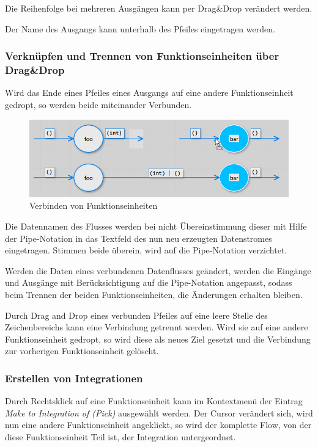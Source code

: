 	Die Reihenfolge bei mehreren Ausgängen kann per Drag\&Drop verändert werden.
	
	Der Name des Ausgangs kann unterhalb des Pfeiles eingetragen werden.
	
\subsubsection{Verknüpfen und Trennen von Funktionseinheiten über Drag\&Drop }

	Wird das Ende eines Pfeiles eines Ausgangs auf eine andere Funktionseinheit gedropt, so werden beide
	miteinander Verbunden. 
	
	\begin{figure}[H]
		\centering
		\includegraphics[width=1\linewidth]{./img/dragdrop.jpg} 
		\caption{Verbinden von Funktionseinheiten}
	\end{figure}
	
	
	
	
	Die Datennamen des Flusses werden bei nicht
	Übereinstimmung dieser mit Hilfe der Pipe-Notation in das Textfeld des nun neu
	erzeugten Datenstromes eingetragen. Stimmen beide überein, wird auf die Pipe-Notation
	verzichtet.
	
	
	
	Werden die Daten eines verbundenen Datenflusses geändert, werden die Eingänge
	und Ausgänge mit Berücksichtigung auf die Pipe-Notation angepasst, sodass
	beim Trennen der beiden Funktionseinheiten, die Änderungen erhalten bleiben.
	
	Durch Drag and Drop eines verbunden Pfeiles auf eine leere Stelle des
	Zeichenbereichs kann eine Verbindung getrennt werden. Wird sie auf eine
	andere Funktionseinheit gedropt, so wird diese als neues Ziel gesetzt und die 
	Verbindung zur vorherigen Funktionseinheit gelöscht. 
	
\subsubsection{Erstellen von Integrationen}

	Durch Rechtsklick auf eine Funktionseinheit kann im Kontextmenü der Eintrag
	\textit{Make to Integration of (Pick)} ausgewählt werden. Der Cursor verändert
	sich, wird nun eine andere Funktionseinheit angeklickt, so wird der
	komplette Flow, von der diese Funktionseinheit Teil ist, der Integration untergeordnet.
	
